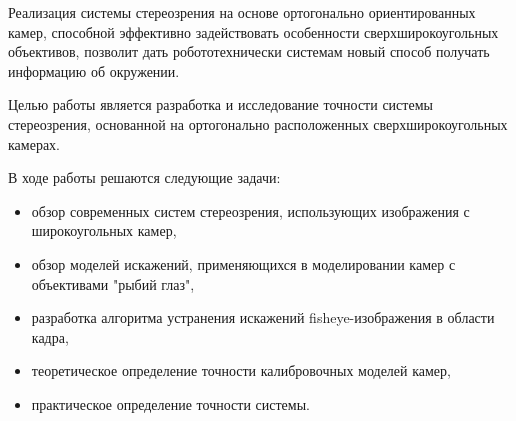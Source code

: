   Реализация системы стереозрения на основе ортогонально ориентированных камер, способной эффективно задействовать особенности 
  сверхширокоугольных объективов, позволит дать робототехнически системам новый способ получать информацию об окружении.

Целью работы является разработка и исследование точности системы стереозрения, основанной на ортогонально расположенных сверхширокоугольных камерах.

В ходе работы решаются следующие задачи:
\begin{itemize}     %
    \item обзор современных систем стереозрения, использующих изображения с широкоугольных камер,
    \item обзор моделей искажений, применяющихся в моделировании камер с объективами "рыбий глаз",
    \item разработка алгоритма устранения искажений fisheye-изображения в  области кадра,                                 
    \item теоретическое определение точности калибровочных моделей камер,
    \item практическое определение точности системы.  
\end{itemize}


\clearpage